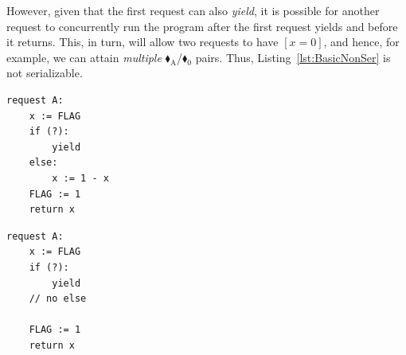 %
%
%
%
%
%
%
%
However, given that the first request can also \textit{yield}, it is possible for another request to concurrently run the program after the first request yields and before it returns. This, in turn, will allow two requests to have $[x=0]$, and hence, for example, we can attain \textit{multiple} {\color{ForestGreen}$\blacklozenge_\text{A}$}/{\color{red}$\blacklozenge_0$} pairs. Thus, Listing~\ref{lst:BasicNonSer} is not serializable.
%
%
%
%
%




\noindent
\begin{minipage}[t]{0.45\textwidth}
	\begin{lstlisting}[caption={Serializable},
		label={lst:BasicSer},numbers=none]
request A: 
    x := FLAG
    if (?):
        yield
    else:
        x := 1 - x
    FLAG := 1
    return x
	\end{lstlisting}
\end{minipage}
\hfill
\begin{minipage}[t]{0.45\textwidth}
	\begin{lstlisting}[caption={Not serializable},
	label={lst:BasicNonSer},numbers=none]
request A: 
    x := FLAG 
    if (?): 
        yield
    // no else
	
    FLAG := 1 
    return x
		\end{lstlisting}
\end{minipage}%

